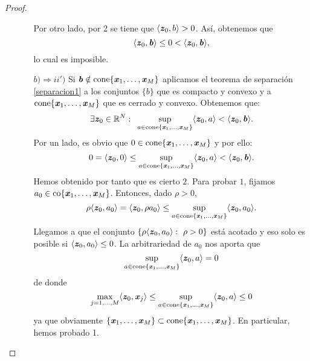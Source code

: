 \begin{proof}
\begin{itemize}
\begin{itemize}
			Por otro lado, por 2 se tiene que  $ \langle \textbf{\emph{z}}_0, b\rangle > 0$. Así, obtenemos que
			\[
			\langle \textbf{\emph{z}}_0, \textbf{\emph{b}} \rangle \leq 0 <  \langle \textbf{\emph{z}}_0, \textbf{\emph{b}} \rangle,
			\]
			lo cual es imposible.
			\item[$ b) \Longrightarrow ii') $] Si $ \textbf{\emph{b}} \notin \mathrm{cone}\{\textbf{\emph{x}}_1,\dots, \textbf{\emph{x}}_M \} $ aplicamos el teorema de separación \ref{separacion1} a los conjuntos $ \{b\} $ que es compacto y convexo y a $ \mathrm{cone}\{\textbf{\emph{x}}_1,\dots, \textbf{\emph{x}}_M \} $ que es cerrado y convexo. Obtenemos que:
			\[
			\exists \textbf{\emph{z}}_0 \in \mathbb{R}^N: \text{ } \sup_{a \in \mathrm{cone}\{\textbf{\emph{x}}_1,\dots, \textbf{\emph{x}}_M \}} \langle \textbf{\emph{z}}_0, a \rangle < \langle \textbf{\emph{z}}_0, \textbf{\emph{b}} \rangle.
			\]
			Por un lado, es obvio que $ 0 \in \mathrm{cone}\{\textbf{\emph{x}}_1,\dots, \textbf{\emph{x}}_M \} $ y por ello:
			\[
			0 = \langle \textbf{\emph{z}}_0, 0\rangle \leq \sup_{a \in \mathrm{cone}\{\textbf{\emph{x}}_1,\dots, \textbf{\emph{x}}_M \}} \langle \textbf{\emph{z}}_0, a \rangle < \langle \textbf{\emph{z}}_0, \textbf{\emph{b}} \rangle.
			\]
			Hemos obtenido por tanto que es cierto $ 2 $. Para probar $ 1 $, fijamos $ a_0 \in \mathrm{co}\{\textbf{\emph{x}}_1,\dots, \textbf{\emph{x}}_M \}$. Entonces, dado $ \rho > 0 $,
			\[
			\rho\langle \textbf{\emph{z}}_0, a_0 \rangle = \langle \textbf{\emph{z}}_0, \rho a_0 \rangle \leq \sup_{a \in \mathrm{cone}\{\textbf{\emph{x}}_1,\dots, \textbf{\emph{x}}_M \}} \langle \textbf{\emph{z}}_0, a_0 \rangle.
			\]
			Llegamos a que el conjunto $ \lbrace\rho\langle \textbf{\emph{z}}_0, a_0 \rangle: \text{ } \rho > 0 \rbrace  $ está acotado y eso solo es posible si $ \langle \textbf{\emph{z}}_0, a_0 \rangle \leq 0 $. La arbitrariedad de $ a_0 $ nos aporta que 
			\[ \sup_{a \in \mathrm{cone}\{\textbf{\emph{x}}_1,\dots, \textbf{\emph{x}}_M \}} \langle \textbf{\emph{z}}_0, a \rangle= 0 \] de donde 
			\[
			\max_{ j=1,\dots,M} \langle \textbf{\emph{z}}_0, \textbf{\emph{x}}_j \rangle \leq \sup_{a \in \mathrm{cone}\{\textbf{\emph{x}}_1,\dots, \textbf{\emph{x}}_M \}} \langle \textbf{\emph{z}}_0, a \rangle \leq 0  
			\]
			ya que obviamente $  \{\textbf{\emph{x}}_1,\dots, \textbf{\emph{x}}_M \} \subset \mathrm{cone}\{\textbf{\emph{x}}_1,\dots, \textbf{\emph{x}}_M \} $. En particular, hemos probado 1.
		\end{itemize}
	\end{itemize}
\end{proof}
\bigskip